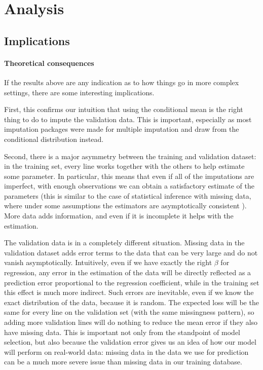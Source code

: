 	\section{Analysis}
		\subsection{Implications}
\paragraph{Theoretical consequences}
If the results above are any indication as to how things go in more complex settings, there are some interesting implications. 

First, this confirms our intuition that using the conditional mean is the right thing to do to impute the validation data. This is important, especially as most imputation packages were made for multiple imputation and draw from the conditional distribution instead.

Second, there is a major asymmetry between the training and validation dataset: in the training set, every line works together with the others to help estimate some parameter. In particular, this means that even if all of the imputations are imperfect, with enough observations we can obtain a satisfactory estimate of the parameters (this is similar to the case of statistical inference with missing data, where under some assumptions the estimators are asymptotically consistent \cite{rubin_ignorability}). More data adds information, and even if it is incomplete it helps with the estimation.

The validation data is in a completely different situation. Missing data in the validation dataset adds error terms to the data that can be very large and do not vanish asymptotically. Intuitively, even if we have exactly the right $\beta$ for regression, any error in the estimation of the data will be directly reflected as a prediction error proportional to the regression coefficient, while in the training set this effect is much more indirect. Such errors are inevitable, even if we know the exact distribution of the data, because it is random. The expected loss will be the same for every line on the validation set (with the same missingness pattern), so adding more validation lines will do nothing to reduce the mean error if they also have missing data. This is important not only from the standpoint of model selection, but also because the validation error gives us an idea of how our model will perform on real-world data: missing data in the data we use for prediction can be a much more severe issue than missing data in our training database.

